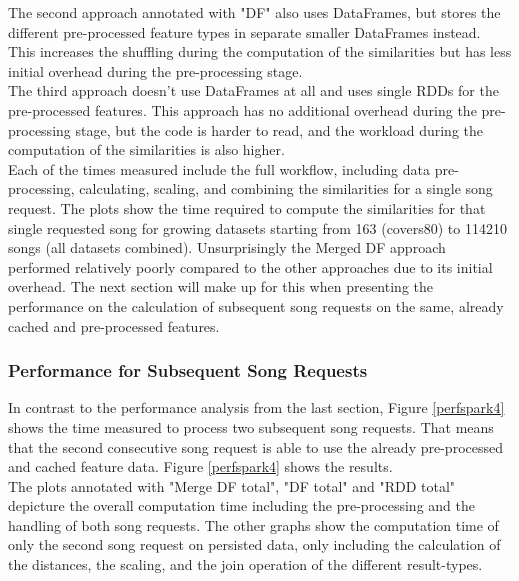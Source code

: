 \noindent The second approach annotated with "DF" also uses DataFrames, but stores the different pre-processed feature types in separate smaller DataFrames instead. This increases the shuffling during the computation of the similarities but has less initial overhead during the pre-processing stage.\\
The third approach doesn't use DataFrames at all and uses single RDDs for the pre-processed features. This approach has no additional overhead during the pre-processing stage, but the code is harder to read, and the workload during the computation of the similarities is also higher.\\
Each of the times measured include the full workflow, including data pre-processing, calculating, scaling, and combining the similarities for a single song request. The plots show the time required to compute the similarities for that single requested song for growing datasets starting from 163 (covers80) to 114210 songs (all datasets combined). 
\noindent Unsurprisingly the Merged DF approach performed relatively poorly compared to the other approaches due to its initial overhead. The next section will make up for this when presenting the performance on the calculation of subsequent song requests on the same, already cached and pre-processed features.

\subsubsection{Performance for Subsequent Song Requests}

In contrast to the performance analysis from the last section, Figure \ref{perfspark4} shows the time measured to process two subsequent song requests. That means that the second consecutive song request is able to use the already pre-processed and cached feature data. Figure \ref{perfspark4} shows the results.\\
\noindent The plots annotated with "Merge DF total", "DF total" and "RDD total" depicture the overall computation time including the pre-processing and the handling of both song requests. The other graphs show the computation time of only the second song request on persisted data, only including the calculation of the distances, the scaling, and the join operation of the different result-types.

